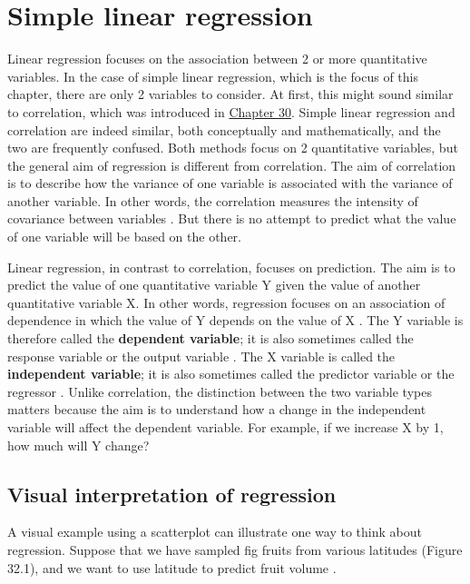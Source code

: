 \documentclass[
]{scrbook}
\begin{document}
\hypertarget{Chapter_32}{%
\chapter{Simple linear regression}\label{Chapter_32}}

Linear regression focuses on the association between 2 or more quantitative variables.
In the case of simple linear regression, which is the focus of this chapter, there are only 2 variables to consider.
At first, this might sound similar to correlation, which was introduced in \protect\hyperlink{Chapter_30}{Chapter 30}.
Simple linear regression and correlation are indeed similar, both conceptually and mathematically, and the two are frequently confused.
Both methods focus on 2 quantitative variables, but the general aim of regression is different from correlation.
The aim of correlation is to describe how the variance of one variable is associated with the variance of another variable.
In other words, the correlation measures the intensity of covariance between variables \citep{Sokal1995}.
But there is no attempt to predict what the value of one variable will be based on the other.

Linear regression, in contrast to correlation, focuses on prediction.
The aim is to predict the value of one quantitative variable Y given the value of another quantitative variable X.
In other words, regression focuses on an association of dependence in which the value of Y depends on the value of X \citep{Rahman1968}.
The Y variable is therefore called the \textbf{dependent variable}; it is also sometimes called the response variable or the output variable \citep{Box1978, Sokal1995}.
The X variable is called the \textbf{independent variable}; it is also sometimes called the predictor variable or the regressor \citep{Box1978, Sokal1995}.
Unlike correlation, the distinction between the two variable types matters because the aim is to understand how a change in the independent variable will affect the dependent variable.
For example, if we increase X by 1, how much will Y change?

\hypertarget{visual-interpretation-of-regression}{%
\section{Visual interpretation of regression}\label{visual-interpretation-of-regression}}

A visual example using a scatterplot can illustrate one way to think about regression.
Suppose that we have sampled fig fruits from various latitudes (Figure 32.1), and we want to use latitude to predict fruit volume \citep{Duthie2016}.
\end{document}
